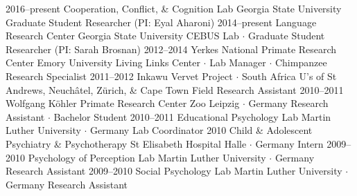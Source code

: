 \documentclass[]{friggeri-cv}
\begin{document}
\begin{entrylist}
  \entry
    {2016--present}
    {Cooperation, Conflict, \& Cognition Lab}
    {Georgia State University}
    {Graduate Student Researcher (PI: Eyal Aharoni)}
  \entry
    {2014--present}
    {Language Research Center}
    {Georgia State University}
    {CEBUS Lab $\cdot$ Graduate Student Researcher (PI: Sarah Brosnan)}
  \entry
    {2012--2014}
    {Yerkes National Primate Research Center}
    {Emory University}
    {Living Links Center $\cdot$ Lab Manager $\cdot$ Chimpanzee Research Specialist}
  \entry
    {2011--2012}
    {Inkawu Vervet Project $\cdot$ South Africa}
    {U's of St Andrews, Neuch\^{a}tel, Z\"urich, \& Cape Town}
    {Field Research Assistant}
  \entry
    {2010--2011}
    {Wolfgang K\"{o}hler Primate Research Center}
    {Zoo Leipzig $\cdot$ Germany}
    {Research Assistant $\cdot$ Bachelor Student}
  \entry
    {2010--2011}
    {Educational Psychology Lab}
    {Martin Luther University $\cdot$ Germany}
    {Lab Coordinator}
  \entry
    {2010}
    {Child \& Adolescent Psychiatry \& Psychotherapy}
    {St Elisabeth Hospital Halle $\cdot$ Germany}
    {Intern}
  \entry
    {2009--2010}
    {Psychology of Perception Lab}
    {Martin Luther University $\cdot$ Germany}
    {Research Assistant}
  \entry
    {2009--2010}
    {Social Psychology Lab}
    {Martin Luther University $\cdot$ Germany}
    {Research Assistant}
\end{entrylist}


\newpage
\thispagestyle{fancy}

\renewenvironment{aside}{%
  \let\oldsection\section
  \renewcommand{\section}[1]{
    \par\vspace{\baselineskip}{\Large\headingfont\color{headercolor} ##1}
  }
  \begin{textblock}{3.6}(1.5, 1.5)
  \begin{flushright}
  \obeycr
}{%
  \restorecr
  \end{flushright}
  \end{textblock}
  \let\section\oldsection
}
\end{document}
